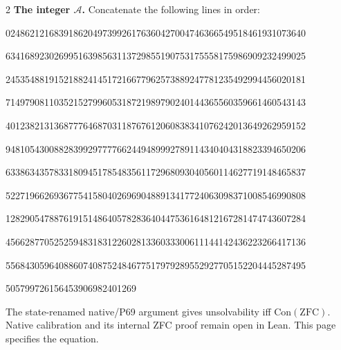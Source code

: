 \documentclass[10pt]{article}
\begin{document}
\begin{multicols}{2}
\textbf{The integer $\mathcal A$.} Concatenate the following lines in order:
\begingroup
\fontsize{8}{9.1}\selectfont{}\par
02486212168391862049739926176360427004746366549518461931073640\par
63416892302699516398563113729855190753175558175986909232499025\par
24535488191521882414517216677962573889247781235492994456020181\par
71497908110352152799605318721989790240144365560359661460543143\par
40123821313687776468703118767612060838341076242013649262959152\par
94810543008828399297777662449489992789114340404318823394650206\par
63386343578331809451785483561172968093040560114627719148465837\par
52271966269367754158040269690488913417724063098371008546990808\par
12829054788761915148640578283640447536164812167281474743607284\par
45662877052525948318312260281336033300611144142436223266417136\par
55684305964088607408752484677517979289552927705152204445287495\par
505799726156453906982401269\par
\endgroup
\medskip
\normalfont\footnotesize
The state-renamed native/P69 argument gives unsolvability iff
$\mathrm{Con}(\mathrm{ZFC})$. Native calibration and its internal ZFC proof
remain open in Lean. This page specifies the equation.
\end{multicols}
\end{document}
